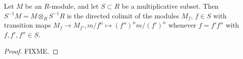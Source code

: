 \begin{lemma}
\label{lemma-localize-colimit}
Let $M$ be an $R$-module, and let $S \subset R$ be
a multiplicative subset. Then $S^{-1}M = M\otimes_R S^{-1}R$
is the directed colimit of the modules $M_f$, $f\in S$ with
transition maps $M_f \to M_{f'}, m/f^n \mapsto (f'')^n m/(f')^n$
whenever $f =f' f''$ with $f,f',f''\in S$.
\end{lemma}

\begin{proof}
FIXME.
\end{proof}







